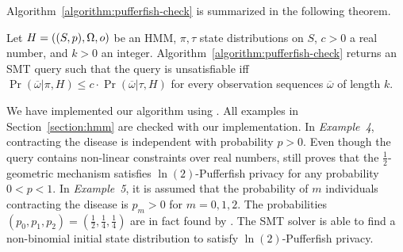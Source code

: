 Algorithm~\ref{algorithm:pufferfish-check} is summarized in the
following theorem.

\begin{theorem}
  Let $H = ((S, p), \Omega, o)$ be an HMM, $\pi, \tau$ state
  distributions on $S$, $c > 0$ a real number, and $k > 0$ an
  integer. Algorithm~\ref{algorithm:pufferfish-check} returns an SMT
  query such that the query is unsatisfiable iff
  $\Pr (\overline{\omega} | \pi, H) \leq c \cdot
  \Pr (\overline{\omega} | \tau, H)$ for every observation
  sequences $\overline{\omega}$ of length $k$.
\end{theorem}


We have implemented our algorithm using \zpython. All examples in
Section~\ref{section:hmm} are checked with our implementation. In
\textit{Example~4}, contracting the disease is independent with
probability $p > 0$. Even though the query contains non-linear
constraints over real numbers, \zpython still proves that the
$\frac{1}{2}$-geometric mechanism satisfies $\ln(2)$-Pufferfish
privacy for any probability $0 < p < 1$. In \textit{Example~5}, it is
assumed that the probability of $m$ individuals contracting the
disease is $p_m > 0$ for $m = 0, 1, 2$. The probabilities $(p_0, p_1,
p_2) = (\frac{1}{2}, \frac{1}{4}, \frac{1}{4})$ are in fact found by
\zpython. The SMT solver is able to find a non-binomial initial state
distribution to satisfy $\ln(2)$-Pufferfish privacy. 
